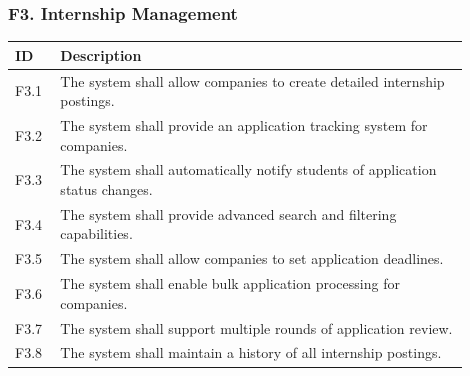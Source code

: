 \subsubsection{F3. Internship Management}
\begin{center}
    \begin{longtable}{ |l|p{0.9\linewidth}| }
        \hline
        \textbf{ID} & \textbf{Description} \\
        \hline
        F3.1 & The system shall allow companies to create detailed internship postings. \\
        \hline
        F3.2 & The system shall provide an application tracking system for companies. \\
        \hline
        F3.3 & The system shall automatically notify students of application status changes. \\
        \hline
        F3.4 & The system shall provide advanced search and filtering capabilities. \\
        \hline
        F3.5 & The system shall allow companies to set application deadlines. \\
        \hline
        F3.6 & The system shall enable bulk application processing for companies. \\
        \hline
        F3.7 & The system shall support multiple rounds of application review. \\
        \hline
        F3.8 & The system shall maintain a history of all internship postings. \\
        \hline
    \end{longtable}
\end{center}

